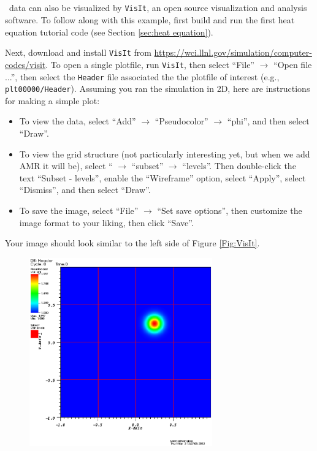 \begin{enumerate}
\section{\visit}

\amrex\ data can also be visualized by {\tt VisIt}, an open
source visualization and analysis software.  To follow along with this example,
first build and run the first heat equation tutorial code
(see Section \ref{sec:heat equation}).

Next, download and install {\tt VisIt} from \url{https://wci.llnl.gov/simulation/computer-codes/visit}.
To open a single plotfile, run {\tt VisIt}, then select ``File'' $\rightarrow$ ``Open file ...'',
then select the {\tt Header} file associated the the plotfile of interest (e.g., {\tt plt00000/Header}).
Assuming you ran the simulation in 2D, here are instructions for making a simple plot:
\begin{itemize}
\item To view the data, select ``Add'' $\rightarrow$ ``Pseudocolor'' $\rightarrow$ ``phi'', and then select
``Draw''.
\item To view the grid structure (not particularly interesting yet, but when we add AMR it will be), select
`` $\rightarrow$ ``subset'' $\rightarrow$ ``levels''.  Then double-click the text ``Subset - levels'',
enable the ``Wireframe'' option, select ``Apply'', select ``Dismiss'', and then select ``Draw''.
\item To save the image, select ``File'' $\rightarrow$ ``Set save options'', then customize the image format
to your liking, then click ``Save''.
\end{itemize}
Your image should look similar to the left side of Figure \ref{Fig:VisIt}.\\
\begin{figure}[tb]
\centering
\includegraphics[width=3.1in]{./Visualization/VisIt_2D}

\end{figure}
\end{enumerate}
